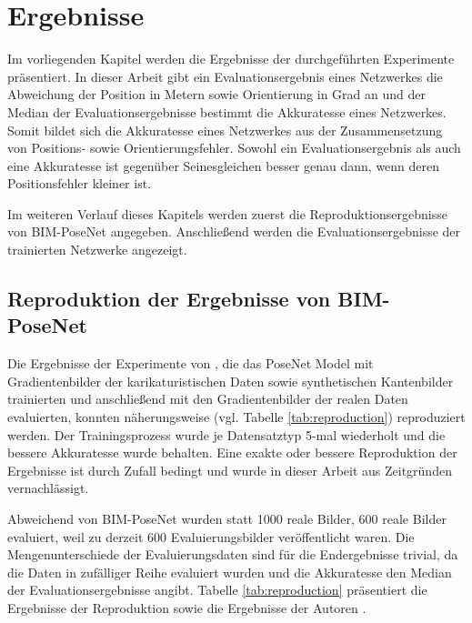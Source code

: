 
\section{Ergebnisse}
Im vorliegenden Kapitel werden die Ergebnisse der durchgeführten Experimente präsentiert. In dieser Arbeit gibt ein Evaluationsergebnis eines Netzwerkes die Abweichung der Position in Metern sowie Orientierung in Grad an und der Median der Evaluationsergebnisse bestimmt die Akkuratesse eines Netzwerkes. Somit bildet sich die Akkuratesse eines Netzwerkes aus der Zusammensetzung von Positions-  sowie Orientierungsfehler. Sowohl ein Evaluationsergebnis als auch eine Akkuratesse ist gegenüber Seinesgleichen besser genau dann, wenn deren Positionsfehler kleiner ist.

Im weiteren Verlauf dieses Kapitels werden zuerst die Reproduktionsergebnisse von BIM-PoseNet \cite{acharyaBIMPoseNetIndoorCamera2019} angegeben. Anschließend werden die Evaluationsergebnisse der trainierten Netzwerke angezeigt.

\subsection{Reproduktion der Ergebnisse von BIM-PoseNet}
Die Ergebnisse der Experimente von \citet{acharyaBIMPoseNetIndoorCamera2019}, die das PoseNet Model mit Gradientenbilder der karikaturistischen Daten sowie synthetischen Kantenbilder trainierten und anschließend mit den Gradientenbilder der realen Daten evaluierten, konnten näherungsweise (vgl. Tabelle \ref{tab:reproduction}) reproduziert werden. Der Trainingsprozess wurde je Datensatztyp 5-mal wiederholt und die bessere Akkuratesse wurde behalten. Eine exakte oder bessere Reproduktion der Ergebnisse ist durch Zufall bedingt und wurde in dieser Arbeit aus Zeitgründen vernachlässigt.

Abweichend von BIM-PoseNet wurden statt 1000 reale Bilder, 600 reale Bilder evaluiert, weil zu derzeit 600 Evaluierungsbilder veröffentlicht waren. Die Mengenunterschiede der Evaluierungsdaten sind für die Endergebnisse trivial, da die Daten in zufälliger Reihe evaluiert wurden und die Akkuratesse den Median der Evaluationsergebnisse angibt. Tabelle \ref{tab:reproduction} präsentiert die Ergebnisse der Reproduktion sowie die Ergebnisse der Autoren \citet{acharyaBIMPoseNetIndoorCamera2019}.


